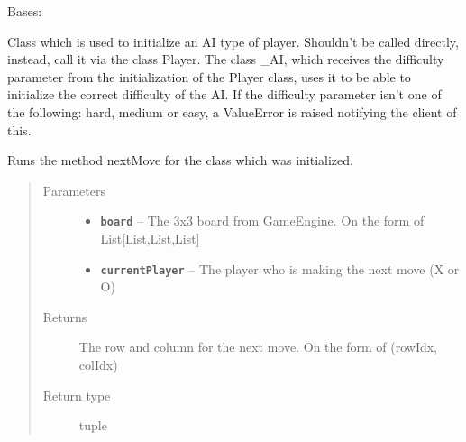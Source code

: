 \documentclass[letterpaper,10pt,english]{sphinxmanual}
\begin{document}
\begin{fulllineitems}
\label{index:AI._AI}
Bases: 

Class which is used to initialize an AI type of player. Shouldn't be called directly, instead,
call it via the class Player. The class \_AI, which receives the difficulty parameter from the initialization
of the Player class, uses it to be able to initialize the correct difficulty of the AI.
If the difficulty parameter isn't one of the following: hard, medium or easy, a ValueError is raised
notifying the client of this.

\begin{fulllineitems}
\label{index:AI._AI.nextMove}
Runs the method nextMove for the class which was initialized.
\begin{quote}\begin{description}
\item[{Parameters}] \leavevmode\begin{itemize}
\item {} 
\textbf{\texttt{board}} -- The 3x3 board from GameEngine. On the form of List{[}List,List,List{]}

\item {} 
\textbf{\texttt{currentPlayer}} -- The player who is making the next move (X or O)

\end{itemize}

\item[{Returns}] \leavevmode
The row and column for the next move. On the form of (rowIdx, colIdx)

\item[{Return type}] \leavevmode
tuple

\end{description}\end{quote}

\end{fulllineitems}


\end{fulllineitems}

\end{document}
